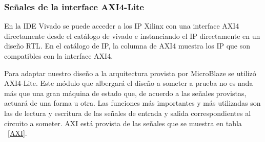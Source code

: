 \documentclass[a4paper,openright,12pt]{report}
\begin{document}
\subsubsection{ Señales de la interface AXI4-Lite}

En la IDE Vivado se puede acceder a los IP Xilinx con una interface AXI4 directamente desde el catálogo de vivado e instanciando el IP directamente en un diseño RTL. En el catálogo  de IP, la columna de AXI4 muestra los IP que son compatibles con la interface AXI4.

Para adaptar nuestro diseño a la arquitectura provista por MicroBlaze se utilizó AXI4-Lite. Este módulo que albergará el diseño a someter a prueba no es nada más que una gran máquina de estado que, de acuerdo a las señales provistas, actuará de una forma u otra. Las funciones más importantes y  más utilizadas son las de lectura y escritura de las señales de entrada y salida correspondientes al circuito a someter.
AXI está provista de las señales que se muestra en  tabla ~\ref{AXI}.
\end{document}

